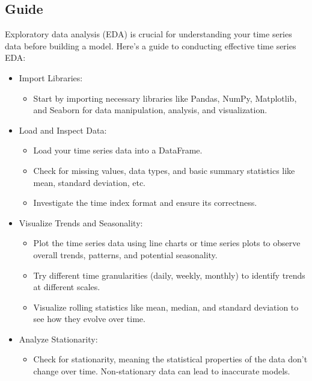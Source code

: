         \subsection{Guide}
                Exploratory data analysis (EDA) is crucial for understanding your time series data before building a model. Here's a guide to conducting effective time series EDA:
                \begin{itemize}
                    \item Import Libraries:
                        \begin{itemize}    
                            \item Start by importing necessary libraries like Pandas, NumPy, Matplotlib, and Seaborn for data manipulation, analysis, and visualization.
                        \end{itemize}
                    \item Load and Inspect Data:
                        \begin{itemize}
                            \item Load your time series data into a DataFrame.
                            \item Check for missing values, data types, and basic summary statistics like mean, standard deviation, etc.
                            \item Investigate the time index format and ensure its correctness.
                        \end{itemize}
                    \item Visualize Trends and Seasonality:
                        \begin{itemize}
                            \item Plot the time series data using line charts or time series plots to observe overall trends, patterns, and potential seasonality.
                            \item Try different time granularities (daily, weekly, monthly) to identify trends at different scales.
                            \item Visualize rolling statistics like mean, median, and standard deviation to see how they evolve over time.
                        \end{itemize}
                    \item Analyze Stationarity:
                        \begin{itemize}
                            \item Check for stationarity, meaning the statistical properties of the data don't change over time. Non-stationary data can lead to inaccurate models.

\end{itemize}
\end{itemize}
